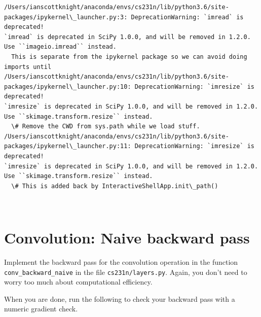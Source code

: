 \documentclass[11pt]{article}
\begin{document}
    \begin{Verbatim}[commandchars=\\\{\}]
/Users/ianscottknight/anaconda/envs/cs231n/lib/python3.6/site-packages/ipykernel\_launcher.py:3: DeprecationWarning: `imread` is deprecated!
`imread` is deprecated in SciPy 1.0.0, and will be removed in 1.2.0.
Use ``imageio.imread`` instead.
  This is separate from the ipykernel package so we can avoid doing imports until
/Users/ianscottknight/anaconda/envs/cs231n/lib/python3.6/site-packages/ipykernel\_launcher.py:10: DeprecationWarning: `imresize` is deprecated!
`imresize` is deprecated in SciPy 1.0.0, and will be removed in 1.2.0.
Use ``skimage.transform.resize`` instead.
  \# Remove the CWD from sys.path while we load stuff.
/Users/ianscottknight/anaconda/envs/cs231n/lib/python3.6/site-packages/ipykernel\_launcher.py:11: DeprecationWarning: `imresize` is deprecated!
`imresize` is deprecated in SciPy 1.0.0, and will be removed in 1.2.0.
Use ``skimage.transform.resize`` instead.
  \# This is added back by InteractiveShellApp.init\_path()

    \end{Verbatim}

    \begin{center}
    \end{center}
    { \hspace*{\fill} \\}
    
    \section{Convolution: Naive backward
pass}\label{convolution-naive-backward-pass}

Implement the backward pass for the convolution operation in the
function \texttt{conv\_backward\_naive} in the file
\texttt{cs231n/layers.py}. Again, you don't need to worry too much about
computational efficiency.

When you are done, run the following to check your backward pass with a
numeric gradient check.
\end{document}
